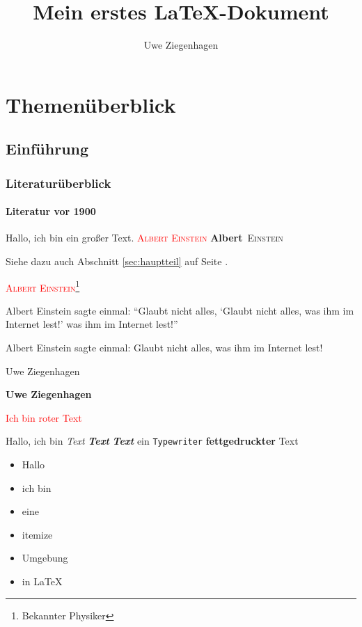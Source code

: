 \documentclass[12pt,ngerman,parskip=half]{scrreprt}
\author{Uwe Ziegenhagen}
\title{Mein erstes \LaTeX-Dokument}
\newcommand{\person}[1]{\textcolor{red}{\textsc{#1}}}
\newcommand{\pperson}[2]{\textbf{#1}~\textsc{#2}}
\begin{document}
\maketitle

\tableofcontents

\chapter{Themenüberblick}

\section{Einführung}
\subsection{Literaturüberblick}
\subsubsection{Literatur vor 1900}

Hallo, ich {\tiny bin} ein {\Huge großer} Text. \person{Albert Einstein} \pperson{Albert}{Einstein} 

Siehe dazu auch Abschnitt \ref{sec:hauptteil} auf Seite \pageref{sec:hauptteil}.

\person{Albert Einstein}\footnote{Bekannter Physiker}

Albert Einstein sagte einmal: \enquote{Glaubt nicht alles, \enquote{Glaubt nicht alles, was ihm im Internet lest!} was ihm im Internet lest!}

Albert Einstein sagte einmal: \glqq Glaubt nicht alles, was ihm im Internet lest!\grqq


\textmd{Uwe Ziegenhagen}

\textbf{Uwe Ziegenhagen}

\textcolor{red}{Ich bin roter Text}

Hallo, ich bin \textit{Text} \textit{\textbf{Text}} \textbf{\textit{Text}}   ein \texttt{Typewriter} \textbf{fettgedruckter} Text

\blindtext \clearpage

\begin{itemize}
	\item Hallo
	\item ich bin
	\item eine 
	\item itemize
	\item Umgebung
	\item in LaTeX
\end{itemize}
\end{document}
